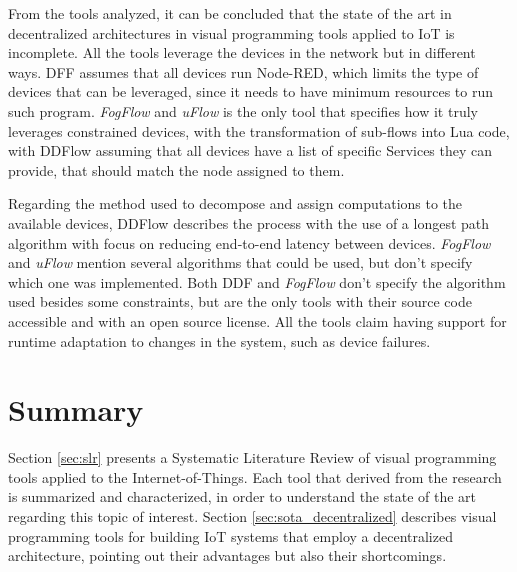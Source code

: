 From the tools analyzed, it can be concluded that the state of the art in decentralized architectures in visual programming tools applied to IoT is incomplete. All the tools leverage the devices in the network but in different ways. DFF \cite{ddf} assumes that all devices run Node-RED, which limits the type of devices that can be leveraged, since it needs to have minimum resources to run such program. \textit{FogFlow} and \textit{uFlow} \cite{fog_flow} \cite{flow_based_programming_fog} is the only tool that specifies how it truly leverages constrained devices, with the transformation of sub-flows into Lua code, with DDFlow \cite{ddflow} assuming that all devices have a list of specific Services they can provide, that should match the node assigned to them.

Regarding the method used to decompose and assign computations to the available devices, DDFlow describes the process with the use of a longest path algorithm with focus on reducing end-to-end latency between devices. \textit{FogFlow} and \textit{uFlow} \cite{fog_flow} \cite{flow_based_programming_fog} mention several algorithms that could be used, but don't specify which one was implemented. Both DDF \cite{ddf} and \textit{FogFlow} \cite{fog_flow_easy} \cite{fog_flow_tool} don't specify the algorithm used besides some constraints, but are the only tools with their source code accessible and with an open source license. All the tools claim having support for runtime adaptation to changes in the system, such as device failures.


\section{Summary}

Section \ref{sec:slr} presents a Systematic Literature Review of visual programming tools applied to the Internet-of-Things. Each tool that derived from the research is summarized and characterized, in order to understand the state of the art regarding this topic of interest. Section \ref{sec:sota_decentralized} describes visual programming tools for building IoT systems that employ a decentralized architecture, pointing out their advantages but also their shortcomings.

